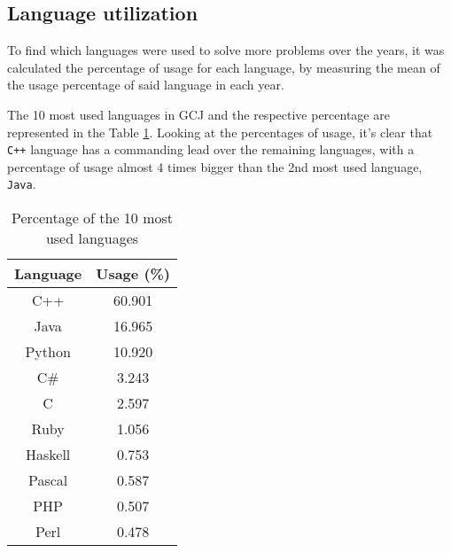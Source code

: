 \documentclass{article}
\begin{document}
\begin{multicols*}{2}


\subsection{Language utilization}

To find which languages were used to solve more problems over the years, it was calculated the percentage of usage for each language, by measuring the mean of the usage percentage of said language in each year.

The 10 most used languages in GCJ and the respective percentage are represented in the Table \ref{lang_perc}.
Looking at the percentages of usage, it's clear that \texttt{C++} language has a commanding lead over the remaining languages, with a percentage of usage almost 4 times bigger than the 2nd most used language, \texttt{Java}.

\begin{table}[H]
\centering
\caption{Percentage of the 10 most used languages}
\label{lang_perc}
\begin{tabular}{c|c}
\textbf{Language} & \textbf{Usage (\%)} \\ \hline
C++               & 60.901       \\
Java              & 16.965       \\
Python            & 10.920       \\
C\#               & 3.243        \\
C                 & 2.597        \\
Ruby              & 1.056        \\
Haskell           & 0.753        \\
Pascal            & 0.587        \\
PHP               & 0.507        \\
Perl              & 0.478
\end{tabular}
\end{table}


\end{multicols*}
\end{document}
